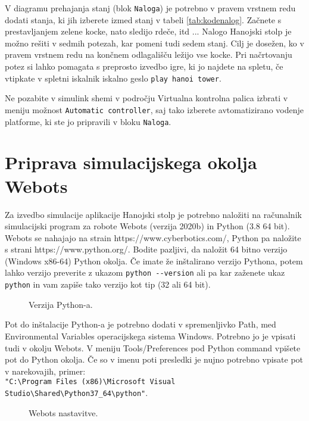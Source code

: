 V diagramu prehajanja stanj (blok \verb"Naloga") je potrebno v pravem vrstnem redu dodati stanja, ki jih izberete izmed stanj v tabeli \ref{tab:kodenalog}. Začnete s prestavljanjem zelene kocke, nato sledijo rdeče, itd ... Nalogo Hanojski stolp je možno rešiti v sedmih potezah, kar pomeni tudi sedem stanj. Cilj je dosežen, ko v pravem vrstnem redu na končnem odlagališču ležijo vse kocke. Pri načrtovanju potez si lahko pomagata s preprosto izvedbo igre, ki jo najdete na spletu, če vtipkate v spletni iskalnik iskalno geslo \verb|play hanoi tower|.

Ne pozabite v simulink shemi v področju Virtualna kontrolna palica izbrati v meniju možnost \verb|Automatic controller|, saj tako  izberete avtomatizirano vodenje platforme, ki ste jo pripravili v bloku \verb"Naloga".

\section{Priprava simulacijskega okolja Webots}

Za izvedbo simulacije aplikacije Hanojski stolp je potrebno naložiti na računalnik simulacijski program za robote Webots (verzija 2020b) in Python (3.8 64 bit). Webots se nahajajo na strain https://www.cyberbotics.com/, Python pa naložite s strani https://www.python.org/. Bodite pazljivi, da naložit 64 bitno verzijo (Windows x86-64) Python okolja. Če imate že inštalirano verzijo Pythona, potem lahko verzijo preverite z ukazom \verb|python --version| ali pa kar zaženete ukaz \verb|python| in vam zapiše tako verzijo kot tip (32 ali 64 bit). 

\begin{figure}[h]
	\centering {}
	\caption{Verzija Python-a.}
	\label{fig:python}
\end{figure}

Pot do inštalacije Python-a je potrebno dodati v spremenljivko Path, med Environmental Variables operacijskega sistema Windows. Potrebno jo je vpisati tudi v okolju Webots. V meniju Tools/Preferences pod Python command vpišete pot do Python okolja. Če so v imenu poti presledki je nujno potrebno vpisate pot v narekovajih, primer: \\ \verb|"C:\Program Files (x86)\Microsoft Visual Studio\Shared\Python37_64\python"|. 

\begin{figure}[h]
	\centering {}
	\caption{Webots nastavitve.}
	\label{fig:webots1}
\end{figure}

